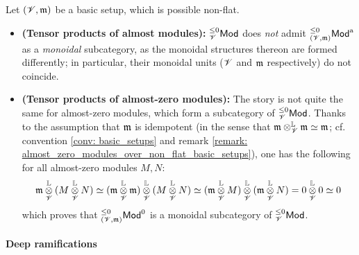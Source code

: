                     \begin{remark} \label{remark: incompatible_monoidal_structures_almost_modules}
                        Let $(\mathscr{V}, \mathfrak{m})$ be a basic setup, which is possible non-flat.
                        \begin{itemize}
                            \item \textbf{(Tensor products of almost modules):} ${}_{\mathscr{V}}^{\leq 0}\mathsf{Mod}$ does \textit{not} admit ${}_{(\mathscr{V}, \mathfrak{m})}^{\leq 0}\mathsf{Mod}^{\mathrm{a}}$ as a \textit{monoidal} subcategory, as the monoidal structures thereon are formed differently; in particular, their monoidal units ($\mathscr{V}$ and $\mathfrak{m}$ respectively) do not coincide.
                            \item \textbf{(Tensor products of almost-zero modules):} The story is not quite the same for almost-zero modules, which form a subcategory of ${}_{\mathscr{V}}^{\leq 0}\mathsf{Mod}$. Thanks to the assumption that $\mathfrak{m}$ is idempotent (in the sense that $\m \tensor_{\scrV}^{\L} \m \cong \m$; cf. convention \ref{conv: basic_setups} and remark \ref{remark: almost_zero_modules_over_non_flat_basic_setups}), one has the following for all almost-zero modules $M, N$:
                                $$\m \tensor_{\scrV}^{\L} (M \tensor_{\scrV}^{\L} N) \cong (\m \tensor_{\scrV}^{\L} \m) \tensor_{\scrV}^{\L} (M \tensor_{\scrV}^{\L} N) \cong (\m \tensor_{\scrV}^{\L} M) \tensor_{\scrV}^{\L} (\m \tensor_{\scrV}^{\L} N) = 0 \tensor_{\scrV}^{\L} 0 \cong 0$$
                            which proves that ${}_{(\mathscr{V}, \mathfrak{m})}^{\leq 0}\mathsf{Mod}^0$ is a monoidal subcategory of ${}_{\mathscr{V}}^{\leq 0}\mathsf{Mod}$. 
                        \end{itemize}
                    \end{remark}
                    
                    \begin{definition} \label{def: almost_flatness}
                    
                    \end{definition}
                
                \paragraph{Deep ramifications}
                
